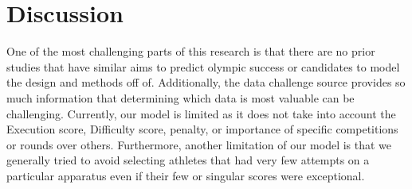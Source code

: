 \documentclass[12pt]{article}
\begin{document}
\section{Discussion}
\label{sec:dis}

One of the most challenging parts of this research is that there are no prior studies that have similar
aims to predict olympic success or candidates to model the design and methods off of. Additionally, 
the data challenge source provides so much information that determining which data is most valuable 
can be challenging. Currently, our model is limited as it does not take into account the 
Execution score, Difficulty score, penalty, or importance of specific competitions or rounds over others. 
Furthermore, another limitation of our model is that we generally tried to avoid selecting athletes that
had very few attempts on a particular apparatus even if their few or singular scores were exceptional.



\end{document}
